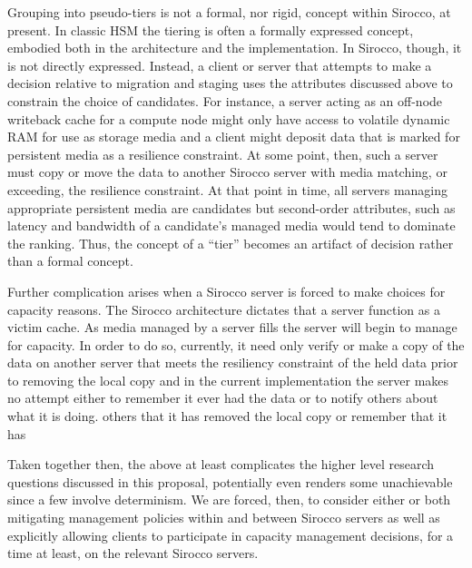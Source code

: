 Grouping into pseudo-tiers is not a formal, nor rigid, concept within Sirocco,
at present. In classic HSM the tiering is often a formally expressed concept,
embodied both in the architecture and the implementation. In Sirocco, though,
it is not directly expressed. Instead, a client or server that attempts to make
a decision relative to migration and staging uses the attributes discussed
above to constrain the choice of candidates. For instance, a server acting as
an off-node writeback cache for a compute node might only have access to
volatile dynamic RAM for use as storage media and a client might deposit data
that is marked for persistent media as a resilience constraint. At some point,
then, such a server must copy or move the data to another Sirocco server with
media matching, or exceeding, the resilience constraint. At that point in time,
all servers managing appropriate persistent media are candidates but
second-order attributes, such as latency and bandwidth of a candidate's managed
media would tend to dominate the ranking. Thus, the concept of a ``tier''
becomes an artifact of decision rather than a formal concept.

Further complication arises when a Sirocco server is forced to make choices for
capacity reasons. The Sirocco architecture dictates that a server function as a
victim cache. As media managed by a server fills the server will begin to
manage for capacity. In order to do so, currently, it need only verify or make
a copy of the data on another server that meets the resiliency constraint of
the held data prior to removing the local copy and in the current
implementation the server makes no attempt either to remember it ever had the
data or to notify others about what it is doing.  others that it has removed
the local copy or remember that it has 

Taken together then, the above at least complicates the higher level research
questions discussed in this proposal, potentially even renders some
unachievable since a few involve determinism. We are forced, then, to consider
either or both mitigating management policies within and between Sirocco
servers as well as explicitly allowing clients to participate in capacity
management decisions, for a time at least, on the relevant Sirocco servers.

